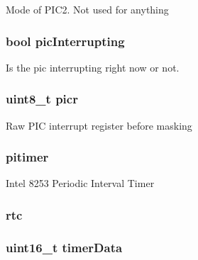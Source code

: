 \label{classMaltaIO_af51e3a81fa6352c9fbc24d5bc03d843f}
Mode of PIC2. Not used for anything \hypertarget{classMaltaIO_ab72d9ca48cf8b7b897799490833c4b5e}{
\subsubsection[{picInterrupting}]{\setlength{\rightskip}{0pt plus 5cm}bool {\bf picInterrupting}}}
\label{classMaltaIO_ab72d9ca48cf8b7b897799490833c4b5e}
Is the pic interrupting right now or not. \hypertarget{classMaltaIO_a8472e2cd6c519d77f7b7ab878a42fa40}{
\subsubsection[{picr}]{\setlength{\rightskip}{0pt plus 5cm}uint8\_\-t {\bf picr}}}
\label{classMaltaIO_a8472e2cd6c519d77f7b7ab878a42fa40}
Raw PIC interrupt register before masking \hypertarget{classMaltaIO_a0447f4b0ded66f26d3ce882c29d1125e}{
\subsubsection[{pitimer}]{ {\bf pitimer}}}
\label{classMaltaIO_a0447f4b0ded66f26d3ce882c29d1125e}
Intel 8253 Periodic Interval Timer \hypertarget{classMaltaIO_afa7e240c7456eaf5ef27ee8be3a23bd4}{
\subsubsection[{rtc}]{ {\bf rtc}}}
\label{classMaltaIO_afa7e240c7456eaf5ef27ee8be3a23bd4}
\hypertarget{classMaltaIO_ac2f6e48e9ea7cdd01d0d4855725107d6}{
\subsubsection[{timerData}]{\setlength{\rightskip}{0pt plus 5cm}uint16\_\-t {\bf timerData}}}
